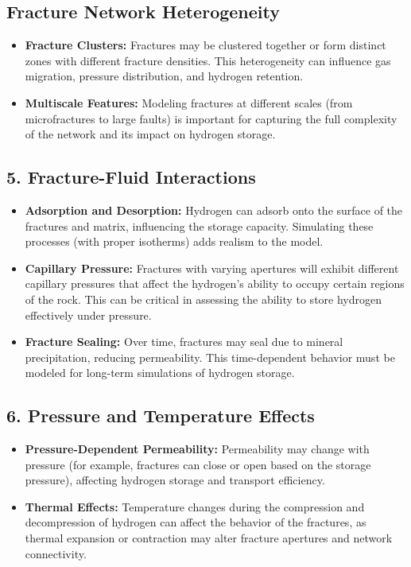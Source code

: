 \documentclass{article}
\begin{document}
\subsection{Fracture Network Heterogeneity}
\begin{itemize}
    \item \textbf{Fracture Clusters:} Fractures may be clustered together or form distinct zones with different fracture densities. This heterogeneity can influence gas migration, pressure distribution, and hydrogen retention.
    \item \textbf{Multiscale Features:} Modeling fractures at different scales (from microfractures to large faults) is important for capturing the full complexity of the network and its impact on hydrogen storage.
\end{itemize}

\subsection{5. Fracture-Fluid Interactions}
\begin{itemize}
    \item \textbf{Adsorption and Desorption:} Hydrogen can adsorb onto the surface of the fractures and matrix, influencing the storage capacity. Simulating these processes (with proper isotherms) adds realism to the model.
    \item \textbf{Capillary Pressure:} Fractures with varying apertures will exhibit different capillary pressures that affect the hydrogen’s ability to occupy certain regions of the rock. This can be critical in assessing the ability to store hydrogen effectively under pressure.
    \item \textbf{Fracture Sealing:} Over time, fractures may seal due to mineral precipitation, reducing permeability. This time-dependent behavior must be modeled for long-term simulations of hydrogen storage.
\end{itemize}

\subsection{6. Pressure and Temperature Effects}
\begin{itemize}
    \item \textbf{Pressure-Dependent Permeability:} Permeability may change with pressure (for example, fractures can close or open based on the storage pressure), affecting hydrogen storage and transport efficiency.
    \item \textbf{Thermal Effects:} Temperature changes during the compression and decompression of hydrogen can affect the behavior of the fractures, as thermal expansion or contraction may alter fracture apertures and network connectivity.
\end{itemize}
\end{document}
